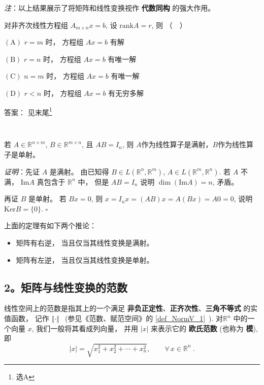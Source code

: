 \textsl{注}：以上结果展示了将矩阵和线性变换视作 \textbf{代数同构} 的强大作用。

\begin{exercise}{}
对非齐次线性方程组 $A_{m\times n}x=b$, 设 $\mathrm{rank}A=r$, 则 （$\quad$）

$(\mathrm{A})$ $r=m$ 时， 方程组 $Ax=b$ 有解

$(\mathrm{B})$ $r=n$ 时， 方程组 $Ax=b$ 有唯一解

$(\mathrm{C})$ $n=m$ 时， 方程组 $Ax=b$ 有唯一解

$(\mathrm{D})$ $r<n$ 时， 方程组 $Ax=b$ 有无穷多解

答案： 见末尾\footnote{选$\mathrm{A}$}
\end{exercise}
\verb| |

\begin{theorem}{}
若 $A\in\mathbb{R}^{n\times m}$, $B\in\mathbb{R}^{m\times n}$, 且 $AB=I_n$, 则 $A$作为线性算子是满射，$B$作为线性算子是单射。

\textsl{证明}：先证 $A$ 是满射。 由已知得 $B\in L(\mathbb{R}^{n},\mathbb{R}^{m})$, $A\in L(\mathbb{R}^{m},\mathbb{R}^{n})$.
若 $A$ 不满， $\mathrm{Im}A$ 真包含于 $\mathbb{R}^{n}$ 中， 但是 $AB=I_{n}$
说明 $\dim(\mathrm{Im}A)=n$, 矛盾。 

再证 $B$ 是单射。 若 $Bx=0$, 则 $x=I_{n}x=(AB)x=A(Bx)=A0=0$, 说明 $\mathrm{Ker}B=\{0\}$.
$\square$
\end{theorem}

上面的定理有如下两个推论：

\begin{itemize}
\item 矩阵有右逆， 当且仅当其线性变换是满射。 \end{itemize}

\begin{itemize}
\item 矩阵有左逆， 当且仅当其线性变换是单射。 
\end{itemize}




\subsection{2。矩阵与线性变换的范数}
线性空间上的范数是指其上的一个满足 \textbf{非负正定性}、\textbf{正齐次性}、\textbf{三角不等式} 的实值函数， 记作 $\left\Vert \cdot\right\Vert ~~$ 
(参见《范数、赋范空间》的 \autoref{def_NormV_1}~). 对$\mathbb{R}^n$ 中的一个向量 $x$, 我们一般将其看成列向量， 并用 $|x|$ 来表示它的 \textbf{欧氏范数} (也称为 \textbf{模}), 即
$$ |x|=\sqrt{x_1^2+x^2_2+\cdots+x_n^2}, \qquad\forall \,x\in \mathbb{R}^n~.
$$

